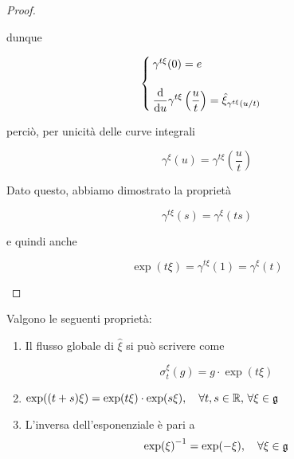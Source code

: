 \begin{proof}
\begin{enumerate}
		dunque
		
		\begin{equation}
			\begin{cases}
				\gamma^{t \xi}(0) = e \\\\
				\ddv{u} \gamma^{t \xi} \left( \dfrac{u}{t} \right) = \hat{\xi}_{\gamma^{t \xi}(u/t)}
			\end{cases}
		\end{equation}
	
		perciò, per unicità delle curve integrali
		
		\begin{equation}
			\gamma^{\xi}(u) = \gamma^{t \xi} \left( \dfrac{u}{t} \right)
		\end{equation}
	
		Dato questo, abbiamo dimostrato la proprietà
		
		\begin{equation}
			\gamma^{t \xi}(s) = \gamma^{\xi}(t s)
		\end{equation}
	
		e quindi anche
		
		\begin{equation}
			\exp(t \xi) = \gamma^{t \xi}(1) = \gamma^{\xi}(t)
		\end{equation}
	\end{enumerate}
\end{proof}

\begin{corollary}
	Valgono le seguenti proprietà:
	
	\begin{enumerate}
		\item Il flusso globale di $ \hat{\xi} $ si può scrivere come
		
		\begin{equation}
			\sigma_{t}^{\xi}(g) = g \cdot \exp(t \xi)
		\end{equation}
		
		\item $ \exp((t+s) \xi) = \exp(t \xi) \cdot \exp(s \xi) %
		\qcomma \forall t,s \in \R, \, \forall \xi \in \g $
		
		\item L'inversa dell'esponenziale è pari a
		\begin{equation}
			\exp(\xi)^{-1} = \exp(-\xi) \qcomma \forall \xi \in \g
		\end{equation}
	\end{enumerate}
\end{corollary}

